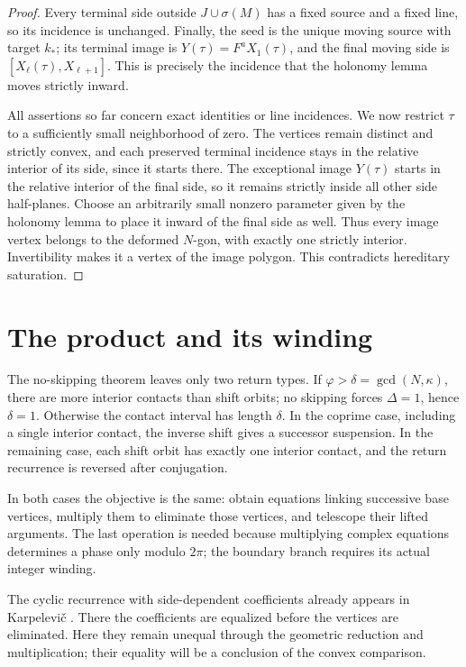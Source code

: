 \documentclass[11pt,a4paper]{article}
\theoremstyle{definition}
\theoremstyle{remark}
\numberwithin{equation}{section}
\begin{document}
\begin{proof}
Every terminal side outside $J\cup\sigma(M)$ has a fixed source and
a fixed line, so its incidence is unchanged.  Finally, the seed is the
unique moving source with target $k_*$; its terminal image is
$Y(\tau)=F^aX_1(\tau)$, and the final moving side is
$[X_\ell(\tau),X_{\ell+1}]$.  This is precisely the incidence that the
holonomy lemma moves strictly inward.

All assertions so far concern exact identities or line incidences.
We now restrict $\tau$ to a sufficiently small neighborhood of zero.
The vertices remain distinct and strictly convex, and each preserved
terminal incidence stays in the relative interior of its side, since
it starts there.  The exceptional image $Y(\tau)$ starts in the
relative interior of the final side, so it remains strictly inside all
other side half-planes.  Choose an arbitrarily small nonzero parameter
given by the holonomy lemma to place it inward of the final side as
well.  Thus every image vertex belongs to the deformed $N$-gon, with
exactly one strictly interior.
Invertibility makes it a vertex of the image polygon.  This contradicts
hereditary saturation.
\end{proof}


\section{The product and its winding}
The no-skipping theorem leaves only two return types. If
$\varphi>\delta=\gcd(N,\kappa)$, there are more interior contacts than
shift orbits; no skipping forces $\Delta=1$, hence $\delta=1$.
Otherwise the contact interval has length $\delta$.
In the coprime case, including a single interior
contact, the inverse shift gives a successor suspension. In the
remaining case, each shift orbit has exactly one interior contact,
and the return recurrence is reversed after conjugation.

In both cases the objective is the same: obtain equations linking
successive base vertices, multiply them to eliminate those vertices,
and telescope their lifted arguments. The last operation is needed
because multiplying complex equations determines a phase only modulo
$2\pi$; the boundary branch requires its actual integer winding.

The cyclic recurrence with side-dependent coefficients already appears in
Karpelevi\v{c} \cite[Theorem~VI and equation~(13), pp.~375--376]{Karp}.
There the coefficients are equalized before the vertices are eliminated.
Here they remain unequal through the geometric reduction and multiplication;
their equality will be a conclusion of the convex comparison.
\end{document}
